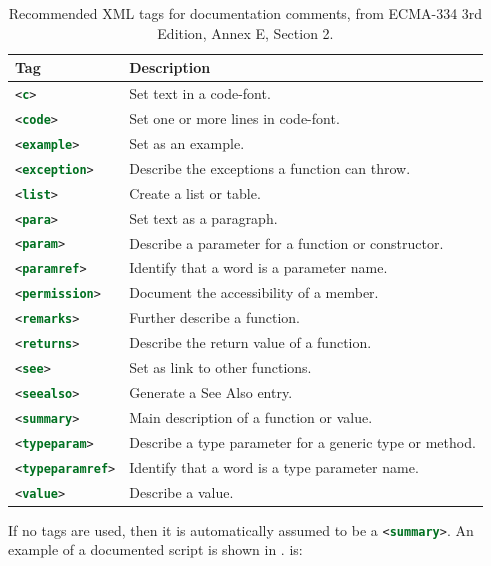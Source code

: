 \documentclass[fsharpNotes.tex]{subfiles}
\begin{document}
\begin{table}
  \centering
  \begin{tabularx}{\linewidth}{|l|X|}
       \hline
    \rowcolor{headerRowColor} Tag & Description\\
    \hline
    \lstinline[language=xml]!<c>! &Set text in a code-font.\\
    \hline
    \lstinline[language=xml]!<code>! &Set one or more lines in code-font.\\
    \hline
    \lstinline[language=xml]!<example>! &Set as an example.\\
    \hline
    \lstinline[language=xml]!<exception>! &Describe the exceptions a function can throw.\\
    \hline
    \lstinline[language=xml]!<list>! &Create a list or table.\\
    \hline
    \lstinline[language=xml]!<para>! &Set text as a paragraph.\\
    \hline
    \lstinline[language=xml]!<param>! &Describe a parameter for a function or constructor.\\
    \hline
    \lstinline[language=xml]!<paramref>! &Identify that a word is a parameter name.\\
    \hline
    \lstinline[language=xml]!<permission>! &Document the accessibility of a member.\\
    \hline
    \lstinline[language=xml]!<remarks>! &Further describe a function.\\
    \hline
    \lstinline[language=xml]!<returns>! &Describe the return value of a function.\\
    \hline
    \lstinline[language=xml]!<see>! &Set as link to other functions.\\
    \hline
    \lstinline[language=xml]!<seealso>! &Generate a See Also entry.\\
    \hline
    \lstinline[language=xml]!<summary>! &Main description of a function or value.\\
    \hline
    \lstinline[language=xml]!<typeparam>! &Describe a type parameter for a generic type or method.\\
    \hline
    \lstinline[language=xml]!<typeparamref>! &Identify that a word is a type parameter name.\\
    \hline
    \lstinline[language=xml]!<value>! &Describe a value.\\
    \hline
  \end{tabularx}
  \caption{Recommended XML tags for documentation comments, from ECMA-334 3rd Edition, Annex E, Section 2.}
  \label{tab:xmlTags}
\end{table}
If no tags are used, then it is automatically assumed to be a \lstinline[language=xml]!<summary>!. An example of a documented script is shown in .
is:
%
%
\end{document}

